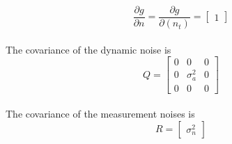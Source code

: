 \documentclass[12pt]{article}
\begin{document}
\begin{equation}
\frac{\partial g}{\partial n} =
\frac{\partial g}{\partial (n_t)} =
\begin{bmatrix}
1 
\end{bmatrix}
\label{eq: Dgn}
\end{equation}
\\ \indent
The covariance of the dynamic noise is
\begin{equation}
Q = \begin{bmatrix}
0 & 0 & 0  \\
0 & \sigma_a^2 & 0  \\
0 & 0 & 0 
\end{bmatrix}
\label{eq: Q}
\end{equation}
\\ \indent
The covariance of the measurement noises is
\begin{equation}
R = \begin{bmatrix}
\sigma_n^2
\end{bmatrix}
\label{eq: R}
\end{equation}
\end{document}

